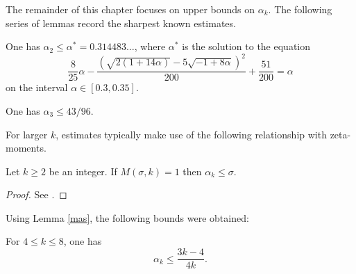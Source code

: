 The remainder of this chapter focuses on upper bounds on $\alpha_k$. The following series of lemmas record the sharpest known estimates.
\begin{theorem}\label{divisor-2-bound}\cite[Theorem 1.2]{li_yang_gauss_2024} One has $\alpha_2 \leq \alpha^* = 0.314483\ldots$, where $\alpha^*$ is the solution to the equation
\[
\frac{8}{25}\alpha - \frac{(\sqrt{2(1+14\alpha)} - 5\sqrt{-1+8\alpha})^2}{200} + \frac{51}{200} = \alpha
\]
on the interval $\alpha \in [0.3, 0.35]$.
\end{theorem}

\begin{theorem}\label{divisor-kolesnik}\cite{kolesnik} One has $\alpha_3 \leq 43/96$.
\end{theorem}

For larger $k$, estimates typically make use of the following relationship with zeta-moments.

\begin{lemma}\label{mas}  Let $k \geq 2$ be an integer. If $M(\sigma,k) = 1$ then $\alpha_k \leq \sigma$.
\end{lemma}

\begin{proof}  See \cite[\S 13.3]{ivic}.
\end{proof}

Using Lemma \ref{mas}, the following bounds were obtained:

\begin{theorem}\cite{heathbrown_mean_1981} For $4 \le k \le 8$, one has
\[
\alpha_k \leq \frac{3k-4}{4k}.
\]
\end{theorem}

